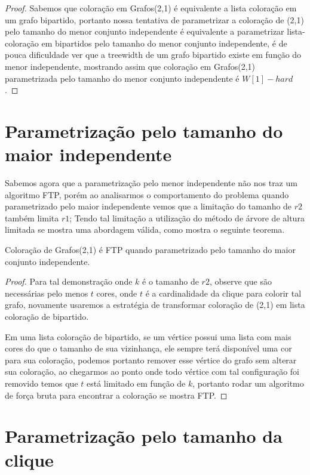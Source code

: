 \begin{proof}
	Sabemos que coloração em Grafos(2,1) é equivalente a lista coloração em um grafo bipartido, portanto nossa tentativa de parametrizar a coloração de (2,1) pelo tamanho do menor conjunto independente é equivalente a parametrizar lista-coloração em bipartidos pelo tamanho do menor conjunto independente, é de pouca dificuldade ver que a treewidth de um grafo bipartido existe em função do menor independente, mostrando assim que coloração em Grafos(2,1) parametrizada pelo tamanho do menor conjunto independente é $W[1]-hard$. 
	
\end{proof}

\section{Parametrização pelo tamanho do maior independente}

 Sabemos agora que a parametrização pelo menor independente não nos traz um algoritmo FTP, porém ao analisarmos o comportamento do problema quando parametrizado pelo maior independente vemos que a limitação do tamanho de $r2$ também limita $r1$; Tendo tal limitação a utilização do método de árvore de altura limitada se mostra uma abordagem válida, como mostra o seguinte teorema.
\begin{teorema}
  Coloração de Grafos(2,1) é FTP quando parametrizado pelo tamanho do maior conjunto independente.
\end{teorema}
\begin{proof}
  Para tal demonstração onde $k$ é o tamanho de $r2$, observe que são necessárias pelo menos $t$ cores, onde $t$ é a cardinalidade da clique para colorir tal grafo, novamente usaremos a estratégia de transformar coloração de (2,1) em lista coloração de bipartido.
  
  Em uma lista coloração de bipartido, se um vértice possui uma lista com mais cores do que o tamanho de sua vizinhança, ele sempre terá disponível uma cor para sua coloração, podemos portanto remover esse vértice do grafo sem alterar sua coloração, ao chegarmos ao ponto onde todo vértice com tal configuração foi removido temos que $t$ está limitado em função de $k$, portanto rodar um algoritmo de força bruta para encontrar a coloração se mostra FTP.     
\end{proof}

\section{Parametrização pelo tamanho da clique}

